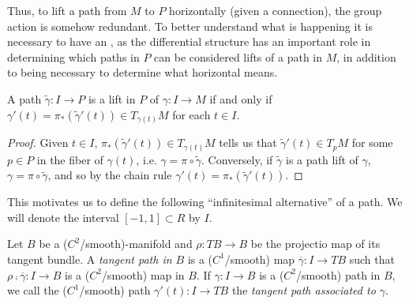 Thus, to lift a path from $M$ to $P$ horizontally (given a connection), the group action is somehow redundant. To better understand what is happening it is necessary to have an , as the differential structure has an important role in determining which paths in $P$ can be considered lifts of a path in $M$, in addition to being necessary to determine what horizontal means. 


\begin{proposition}
A path $\tilde{\gamma}:I \to P$ is a lift in $P$ of $\gamma:I \to M$ if and only if $\gamma'(t) = \pi_*(\tilde{\gamma}'(t)) \in T_{\gamma(t)}M$ for each $t \in I$.
\end{proposition}

\begin{proof}
Given $t \in I$, $\pi_*(\tilde{\gamma}'(t)) \in T_{\gamma(t)}M$ tells us that $\tilde{\gamma}'(t) \in T_p M$ for some $p \in P$ in the fiber of $\gamma(t)$, i.e. $\gamma = \pi \circ \tilde{\gamma}$. Conversely, if $\tilde{\gamma}$ is a path lift of $\gamma$, $\gamma = \pi \circ \tilde{\gamma}$, and so by the chain rule $\gamma'(t) = \pi_*(\tilde{\gamma}'(t))$.
\end{proof}

This motivates us to define the following ``infinitesimal alternative'' of a path. We will denote the interval $[-1, 1] \subset R$ by $I$.

\begin{definition} 
Let $B$ be a ($C^2$/smooth)-manifold and $\rho: TB \to B$ be the projectio map of its tangent bundle. A \emph{tangent path in $B$} is a ($C^1$/smooth) map $\overline{\gamma}:I \to TB$ such that $\rho \comp \overline{\gamma} : I \to B$ is a ($C^2$/smooth) map in $B$. If $\gamma: I \to B$ is a ($C^2$/smooth) path in $B$, we call the ($C^1$/smooth) path $\gamma'(t): I \to TB$ the \emph{tangent path associated to $\gamma$}.   
\end{definition}

